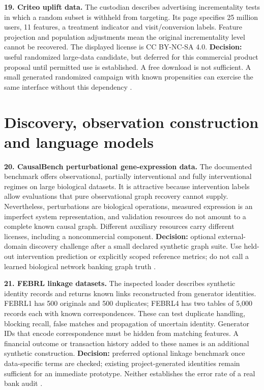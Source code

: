 \textbf{19. Criteo uplift data.} The custodian describes advertising
incrementality tests in which a random subset is withheld from
targeting. Its page specifies 25 million users, 11 features, a treatment
indicator and visit/conversion labels. Feature projection and population
adjustments mean the original incrementality level cannot be recovered.
The displayed license is CC BY-NC-SA 4.0. \textbf{Decision:} useful
randomized large-data candidate, but deferred for this commercial
product proposal until permitted use is established. A free download is
not sufficient. A small generated randomized campaign with known
propensities can exercise the same interface without this dependency
\citep{pd15_criteo}.

\hypertarget{discovery-observation-construction-and-language-models}{%
\section{Discovery, observation construction and language
models}\label{discovery-observation-construction-and-language-models}}

\textbf{20. CausalBench perturbational gene-expression data.} The
documented benchmark offers observational, partially interventional and
fully interventional regimes on large biological datasets. It is
attractive because intervention labels allow evaluations that pure
observational graph recovery cannot supply. Nevertheless, perturbations
are biological operations, measured expression is an imperfect system
representation, and validation resources do not amount to a complete
known causal graph. Different auxiliary resources carry different
licenses, including a noncommercial component. \textbf{Decision:}
optional external-domain discovery challenge after a small declared
synthetic graph suite. Use held-out intervention prediction or
explicitly scoped reference metrics; do not call a learned biological
network banking graph truth \citep{pd15_causalbench_pinned}.

\textbf{21. FEBRL linkage datasets.} The inspected loader describes
synthetic identity records and returns known links reconstructed from
generator identities. FEBRL1 has 500 originals and 500 duplicates;
FEBRL4 has two tables of 5,000 records each with known correspondences.
These can test duplicate handling, blocking recall, false matches and
propagation of uncertain identity. Generator IDs that encode
correspondence must be hidden from matching features. A financial
outcome or transaction history added to these names is an additional
synthetic construction. \textbf{Decision:} preferred optional linkage
benchmark once data-specific terms are checked; existing
project-generated identities remain sufficient for an immediate
prototype. Neither establishes the error rate of a real bank audit
\citep{pd15_febrl_source}.

